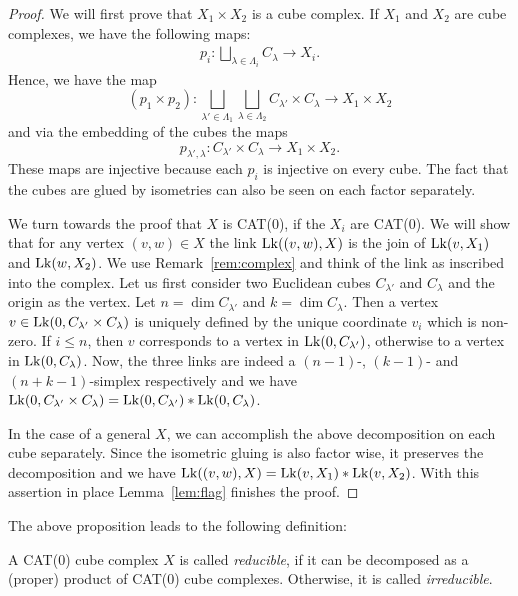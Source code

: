 \begin{proof}
  We will first prove that \(X_1 \times X_2\) is a cube complex. If \(X_1\) and \(X_2\) are cube complexes, we have the following maps:
  \begin{align*}
    p_i \colon \bigsqcup_{\lambda \in \Lambda_i} C_\lambda \to X_i.
  \end{align*}
  Hence, we have the map
  \[
    (p_1 \times p_2) \colon \bigsqcup_{\lambda' \in \Lambda_1} \bigsqcup_{\lambda \in \Lambda_2} C_{\lambda'} \times C_{\lambda} \to X_1 \times X_2
  \]
  and via the embedding of the cubes the maps
  \[
    p_{\lambda', \lambda} \colon C_{\lambda'} \times C_{\lambda} \to X_1 \times X_2.
  \]
  These maps are injective because each \(p_i\) is injective on every cube. The fact that the cubes are glued by isometries can also be seen on each factor separately.

  We turn towards the proof that \(X\) is CAT(0), if the \(X_i\) are CAT(0). We will show that for any vertex \((v,w) \in X\) the link \(\operatorname{Lk}((v,w), X)\) is the join of \(\operatorname{Lk}(v, X_1)\) and \(\operatorname{Lk}(w,X_2)\). We use Remark~\ref{rem:complex} and think of the link as inscribed into the complex. Let us first consider two Euclidean cubes \(C_{\lambda'}\) and \(C_\lambda\) and the origin as the vertex. Let \(n = \dim C_{\lambda'}\) and \(k = \dim C_\lambda\). Then a vertex \(v \in \operatorname{Lk}(0, C_{\lambda'} \times C_{\lambda})\) is uniquely defined by the unique coordinate \(v_i\) which is non-zero. If \(i \leq n\), then \(v\) corresponds to a vertex in \(\operatorname{Lk}(0, C_{\lambda'})\), otherwise to a vertex in \(\operatorname{Lk}(0, C_\lambda)\). Now, the three links are indeed a \((n-1)\)-, \((k-1)\)- and \((n+k-1)\)-simplex respectively and we have \(\operatorname{Lk}(0, C_{\lambda'} \times C_\lambda) = \operatorname{Lk}(0, C_{\lambda'}) \ast \operatorname{Lk}(0, C_{\lambda})\).

  In the case of a general \(X\), we can accomplish the above decomposition on each cube separately. Since the isometric gluing is also factor wise, it preserves the decomposition and we have \(\operatorname{Lk}((v,w), X) = \operatorname{Lk}(v, X_1) \ast \operatorname{Lk}(v, X_2)\). With this assertion in place Lemma~\ref{lem:flag} finishes the proof.
\end{proof}

The above proposition leads to the following definition:

\begin{defin}
  A CAT(0) cube complex \(X\) is called \emph{reducible}, if it can be decomposed as a (proper) product of CAT(0) cube complexes. Otherwise, it is called \emph{irreducible}.
\end{defin}

